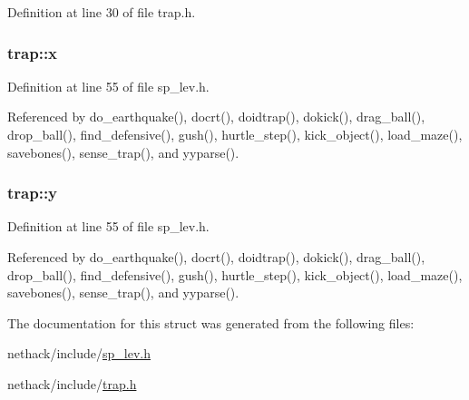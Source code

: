 Definition at line 30 of file trap.\+h.

\hypertarget{structtrap_aed25254cf556e3eae09dd98576d98d45}{
\subsubsection[{x}]{ trap\+::x}}\label{structtrap_aed25254cf556e3eae09dd98576d98d45}


Definition at line 55 of file sp\+\_\+lev.\+h.



Referenced by do\+\_\+earthquake(), docrt(), doidtrap(), dokick(), drag\+\_\+ball(), drop\+\_\+ball(), find\+\_\+defensive(), gush(), hurtle\+\_\+step(), kick\+\_\+object(), load\+\_\+maze(), savebones(), sense\+\_\+trap(), and yyparse().

\hypertarget{structtrap_a3c7f72724bfcd0c4acb2a05ee75064df}{
\subsubsection[{y}]{ trap\+::y}}\label{structtrap_a3c7f72724bfcd0c4acb2a05ee75064df}


Definition at line 55 of file sp\+\_\+lev.\+h.



Referenced by do\+\_\+earthquake(), docrt(), doidtrap(), dokick(), drag\+\_\+ball(), drop\+\_\+ball(), find\+\_\+defensive(), gush(), hurtle\+\_\+step(), kick\+\_\+object(), load\+\_\+maze(), savebones(), sense\+\_\+trap(), and yyparse().



The documentation for this struct was generated from the following files\+:\begin{DoxyCompactItemize}
\item 
nethack/include/\hyperlink{sp__lev_8h}{sp\+\_\+lev.\+h}\item 
nethack/include/\hyperlink{trap_8h}{trap.\+h}\end{DoxyCompactItemize}
